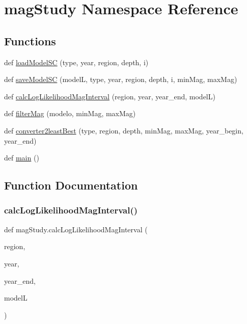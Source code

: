 \hypertarget{namespacemag_study}{}\section{mag\+Study Namespace Reference}
\label{namespacemag_study}
\subsection*{Functions}
\begin{DoxyCompactItemize}
\item 
def \hyperlink{namespacemag_study_a649e8ae23cf682792eb73ca96460ef26}{load\+Model\+SC} (type, year, region, depth, i)
\item 
def \hyperlink{namespacemag_study_a3ae21059e58cebe9b4cfb7f65a965c78}{save\+Model\+SC} (modelL, type, year, region, depth, i, min\+Mag, max\+Mag)
\item 
def \hyperlink{namespacemag_study_aef6086026bc7546d2b82bd9b26c29729}{calc\+Log\+Likelihood\+Mag\+Interval} (region, year, year\+\_\+end, modelL)
\item 
def \hyperlink{namespacemag_study_a00128b94305d32ba4cf222a137eb59a1}{filter\+Mag} (modelo, min\+Mag, max\+Mag)
\item 
def \hyperlink{namespacemag_study_ab2fae2886f74b1b3c92b479d5c5b1b13}{converter2least\+Best} (type, region, depth, min\+Mag, max\+Mag, year\+\_\+begin, year\+\_\+end)
\item 
def \hyperlink{namespacemag_study_aedd1b63a589d0d25496c8cd0589fc46d}{main} ()
\end{DoxyCompactItemize}


\subsection{Function Documentation}
\mbox{\label{namespacemag_study_aef6086026bc7546d2b82bd9b26c29729}} 
\subsubsection{\texorpdfstring{calc\+Log\+Likelihood\+Mag\+Interval()}{calcLogLikelihoodMagInterval()}}
{\footnotesize\ttfamily def mag\+Study.\+calc\+Log\+Likelihood\+Mag\+Interval (\begin{DoxyParamCaption}\item[{}]{region,  }\item[{}]{year,  }\item[{}]{year\+\_\+end,  }\item[{}]{modelL }\end{DoxyParamCaption})}




